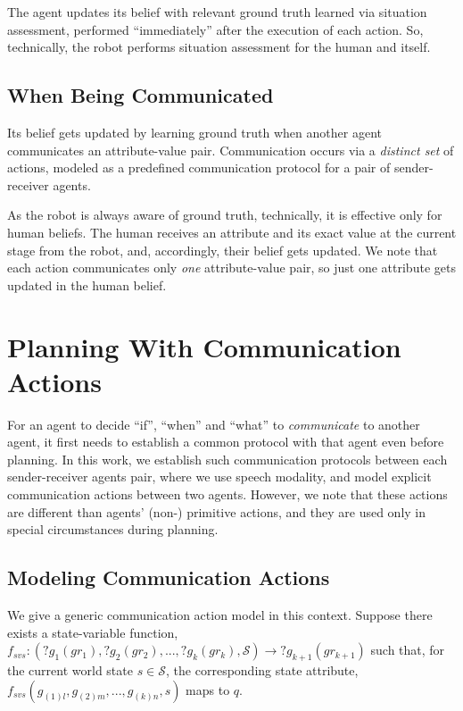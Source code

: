 \documentclass[letterpaper]{article} %
\begin{document}
The agent updates its belief with relevant ground truth learned via situation assessment, performed ``immediately'' after the execution of each action. So, technically, the robot performs situation assessment for the human and itself.

\subsection{When Being Communicated}
Its belief gets updated by learning ground truth when another agent communicates an attribute-value pair. Communication occurs via a \textit{distinct set} of actions, modeled as a predefined communication protocol for a pair of sender-receiver agents. 

As the robot is always aware of ground truth, technically, it is effective only for human beliefs.
The human receives an attribute and its exact value at the current stage from the robot, and, accordingly, their belief gets updated. 
We note that each action communicates only {\em one} attribute-value pair, so just one attribute gets updated in the human belief.


\section{Planning With Communication Actions}
For an agent to decide ``if'', ``when'' and ``what'' to \textit{communicate} to another agent, it first needs to establish a common protocol with that agent even before planning.  
In this work, we establish such communication protocols between each sender-receiver agents pair, where we use speech modality, and model explicit communication actions between two agents. 
However, we note that these actions are different than agents' (non-) primitive actions, and they are used only in special circumstances during planning.

\subsection{Modeling Communication Actions} 
We give a generic communication action model in this context. 
% 
Suppose there exists a state-variable function, $f_{svs}:(?g_1 (gr_1), ?g_2 (gr_2), ..., ?g_k (gr_k),\mathcal{S}) \rightarrow ?g_{k+1} (gr_{k+1})$ such that,
for the current world state $s \in \mathcal{S}$, the corresponding state attribute, $f_{\textit{svs}}(g_{(1)l},g_{(2)m},...,g_{(k)n},s)$ maps to $q$.
\end{document}
